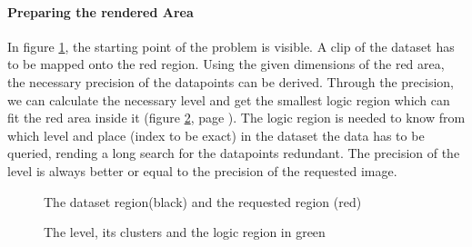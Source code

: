 \documentclass[10pt,a4paper,titlepage]{article}
\begin{document}
	\paragraph{Preparing the rendered Area}
	In figure \ref{fig:region_over_dataset}, the starting point of the problem is visible. A clip of the dataset has to be mapped onto the red region. Using the given dimensions of the red area, the necessary precision of the datapoints can be derived. Through the precision, we can calculate the necessary level and get the smallest logic region which can fit the red area inside it (figure \ref{fig:logic_region_over_dataset}, page \pageref{fig:logic_region_over_dataset}). The logic region is needed to know from which level and place (index to be exact) in the dataset the data has to be queried, rending a long search for the datapoints redundant. The precision of the level is always better or equal to the precision of the requested image.	
	\begin{figure}
	\centering
	\caption{The dataset region(black) and the requested region (red)}
	\label{fig:region_over_dataset}
	\end{figure}
	
	\begin{figure}
		\centering
		\caption{The level, its clusters and the logic region in green}
		\label{fig:logic_region_over_dataset}
	\end{figure}
\end{document}
